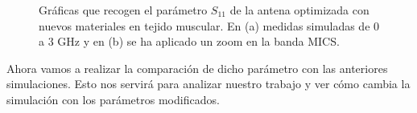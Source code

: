 \begin{figure}[!htb]
    \centering
    \caption{Gráficas que recogen el parámetro $S_{11}$ de la antena optimizada con nuevos materiales en tejido muscular. En (a) medidas simuladas de 0 a 3 GHz y en (b) se ha aplicado un zoom en la banda MICS.}
    \label{fig:fig5.37}
\end{figure}


Ahora vamos a realizar la comparación de dicho parámetro con las anteriores simulaciones. Esto nos servirá para analizar nuestro trabajo y ver cómo cambia la simulación con los parámetros modificados.

